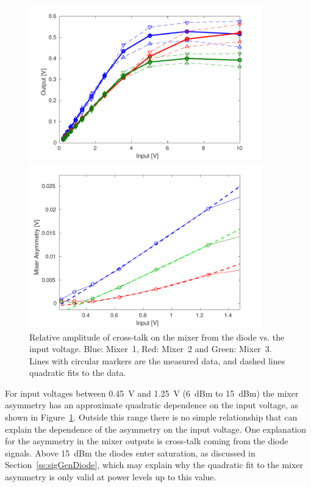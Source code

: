 \begin{figure}
  \centering
  \includegraphics[width=0.9\textwidth]{Figures/phaseMons/MixerVsVolts}
  \caption{Mixer maximum output voltage (dashed lines with upward triangle markers) and minimum output voltage (dashed lines with downward triangle markers) vs. the input voltage. Solid lines with circular markers show the average of the minimum and maximum. Blue: Mixer~1, Red: Mixer~2 and Green: Mixer~3.}
  \label{f:MixerVsVolts}
  \includegraphics[width=0.9\textwidth]{Figures/phaseMons/MixerAsymmetryVsVolts}
  \caption{Relative amplitude of cross-talk on the mixer from the diode vs. the input voltage. Blue: Mixer~1, Red: Mixer~2 and Green: Mixer~3. Lines with circular markers are the measured data, and dashed lines quadratic fits to the data.}
  \label{f:MixerAsymmetryVsVolts}
\end{figure}

For input voltages between 0.45~V and 1.25~V (6~dBm to 15~dBm) the mixer asymmetry has an approximate quadratic dependence on the input voltage, as shown in Figure~\ref{f:MixerAsymmetryVsVolts}. Outside this range there is no simple relationship that can explain the dependence of the asymmetry on the input voltage. One explanation for the asymmetry in the mixer outputs is cross-talk coming from the diode signals. Above 15~dBm the diodes enter saturation, as discussed in Section~\ref{ss:sigGenDiode}, which may explain why the quadratic fit to the mixer asymmetry is only valid at power levels up to this value. 

